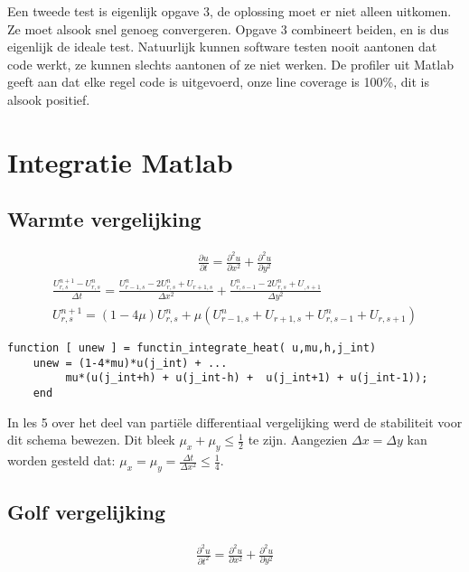\documentclass[11pt]{article} %
\begin{document}
Een tweede test is eigenlijk opgave 3, de oplossing moet er niet alleen uitkomen. Ze moet alsook snel genoeg convergeren. Opgave 3 combineert beiden, en is dus eigenlijk de ideale test. Natuurlijk kunnen software testen nooit aantonen dat code werkt, ze kunnen slechts aantonen of ze niet werken. De profiler uit Matlab geeft aan dat elke regel code is uitgevoerd, onze line coverage is 100\%, dit is alsook positief.

\section{Integratie Matlab}

	\subsection{Warmte vergelijking}
		\begin{eqnarray}
			\frac{\partial u}{\partial t} = 
			\frac{\partial ^2 u}{\partial x^2} + 
			\frac{\partial ^2 u}{\partial  y^2} 	
		\end{eqnarray}
		\begin{eqnarray}
			\frac{U_{r,s}^{n+1} - U_{r,s}^n}{\Delta t} =
			\frac{U_{r-1,s}^n - 2 U_{r,s}^n + U_{r+1,s}}{\Delta x^2} + 
			\frac{U_{r,s-1}^n - 2 U_{r,s}^n + U_{,s+1} }{\Delta y^2} \\
			U_{r,s}^{n+1} =( 1-4\mu )U_{r,s}^n + \mu (U_{r-1,s}^n  + U_{r+1,s} + 
			U_{r,s-1}^n  + U_{r,s+1})
		\end{eqnarray}

\begin{lstlisting}[caption=Code Explicit Euler,label={lst:expl_euler}]
function [ unew ] = functin_integrate_heat( u,mu,h,j_int)
	unew = (1-4*mu)*u(j_int) + ... 
	     mu*(u(j_int+h) + u(j_int-h) +  u(j_int+1) + u(j_int-1));
	end
\end{lstlisting}
		In les 5 over het deel van partiële differentiaal vergelijking werd de stabiliteit voor dit schema bewezen. Dit bleek $\mu_x + \mu_y \leq \frac{1}{2}$ te zijn. Aangezien $\Delta x = \Delta y$ kan worden gesteld dat: $\mu_x = \mu_y =\frac{\Delta t}{\Delta x^2} \leq \frac{1}{4}$.
		
	\subsection{Golf vergelijking}
		\begin{eqnarray}
		\frac{\partial^2 u}{\partial t^2} = 
		\frac{\partial ^2 u}{\partial x^2} + 
		\frac{\partial ^2 u}{\partial  y^2} 	
		\end{eqnarray}
\end{document}
